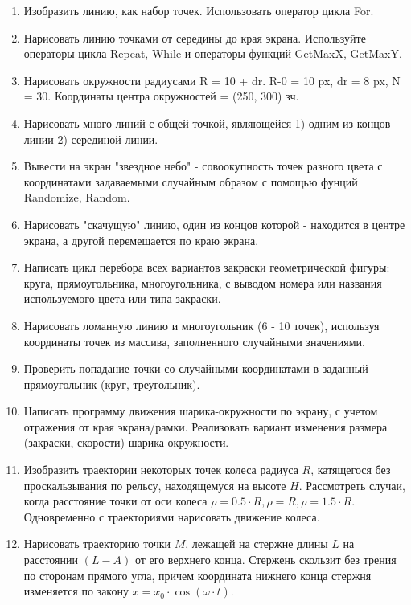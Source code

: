 \begin{enumerate}
  \item Изобразить линию, как набор точек. Использовать оператор цикла For.
  \item Нарисовать линию точками от середины до края экрана. Используйте  операторы цикла Repeat, While и операторы функций GetMaxX, GetMaxY.
  \item Нарисовать окружности радиусами R = 10 + dr. R-0 = 10 px, dr = 8 px, N = 30. Координаты центра окружностей = (250, 300) зч.
  \item Нарисовать много линий с общей точкой, являющейся 1) одним из концов линии 2) серединой линии.
  \item Вывести на экран "звездное небо" - совоокупность точек разного цвета с координатами задаваемыми случайным образом с помощью фунций Randomize, Random.
  \item Нарисовать "скачущую" линию, один из концов которой - находится в центре экрана, а другой перемещается по краю экрана. 
  \item Написать цикл перебора всех вариантов закраски геометрической фигуры: круга, прямоугольника, многоугольника, с выводом номера или названия используемого цвета или типа закраски.
  \item Нарисовать ломанную линию и многоугольник (6 - 10 точек), используя координаты точек  из массива, заполненного случайными значениями. 
  \item Проверить попадание точки со случайными координатами в заданный прямоугольник (круг, треугольник).
  
  \item Написать программу движения шарика-окружности по экрану, с учетом отражения от края экрана/рамки. 
        Реализовать вариант изменения размера (закраски, скорости) шарика-окружности.

\item  Изобразить траектории некоторых точек колеса радиуса $R$, катящегося без проскальзывания по рельсу, находящемуся на высоте $H$. Рассмотреть случаи, когда расстояние точки от оси колеса $\rho = 0.5\cdot R, \rho = R, \rho = 1.5\cdot R$. Одновременно с траекториями нарисовать движение колеса.

\item Нарисовать траекторию точки $M$, лежащей на стержне длины $L$ на расстоянии $(L- A)$ от его верхнего конца. Стержень скользит без трения по сторонам прямого угла, причем координата нижнего конца стержня изменяется по закону $x = x_0\cdot\cos(\omega\cdot t)$.


\end{enumerate}
